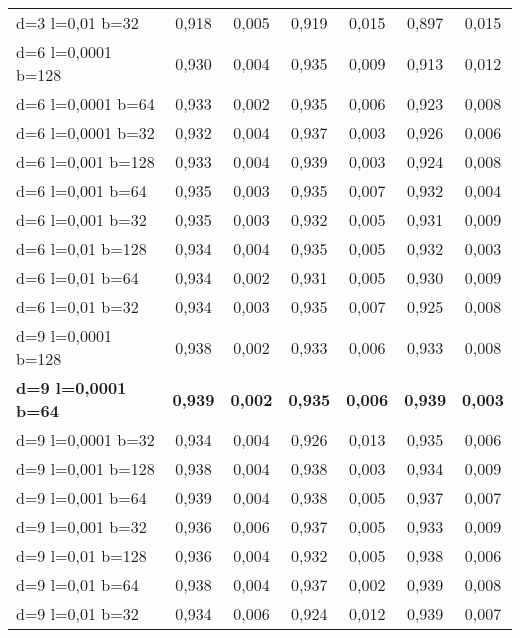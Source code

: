 \begin{table}[h!]
\begin{tabular}{lcccccc}
d=3 l=0,01 b=32  & 0,918  & 0,005  & 0,919  & 0,015 & 0,897 & 0,015 \\
d=6 l=0,0001 b=128  & 0,930  & 0,004  & 0,935  & 0,009 & 0,913 & 0,012 \\
d=6 l=0,0001 b=64  & 0,933  & 0,002  & 0,935  & 0,006 & 0,923 & 0,008 \\
d=6 l=0,0001 b=32  & 0,932  & 0,004  & 0,937  & 0,003 & 0,926 & 0,006 \\
d=6 l=0,001 b=128  & 0,933  & 0,004  & 0,939  & 0,003 & 0,924 & 0,008 \\
d=6 l=0,001 b=64  & 0,935  & 0,003  & 0,935  & 0,007 & 0,932 & 0,004 \\
d=6 l=0,001 b=32  & 0,935  & 0,003  & 0,932  & 0,005 & 0,931 & 0,009 \\
d=6 l=0,01 b=128  & 0,934  & 0,004  & 0,935  & 0,005 & 0,932 & 0,003 \\
d=6 l=0,01 b=64  & 0,934  & 0,002  & 0,931  & 0,005 & 0,930 & 0,009 \\
d=6 l=0,01 b=32  & 0,934  & 0,003  & 0,935  & 0,007 & 0,925 & 0,008 \\
d=9 l=0,0001 b=128  & 0,938  & 0,002  & 0,933  & 0,006 & 0,933 & 0,008 \\
\textbf{d=9 l=0,0001 b=64}  & \textbf{0,939}  & \textbf{0,002}  & \textbf{0,935}  & \textbf{0,006} & \textbf{0,939} & \textbf{0,003}  \\
d=9 l=0,0001 b=32  & 0,934  & 0,004  & 0,926  & 0,013 & 0,935 & 0,006 \\
d=9 l=0,001 b=128  & 0,938  & 0,004  & 0,938  & 0,003 & 0,934 & 0,009 \\
d=9 l=0,001 b=64  & 0,939  & 0,004  & 0,938 & 0,005 & 0,937 & 0,007 \\
d=9 l=0,001 b=32  & 0,936  & 0,006  & 0,937  & 0,005 & 0,933 & 0,009 \\
d=9 l=0,01 b=128  & 0,936  & 0,004  & 0,932  & 0,005 & 0,938 & 0,006 \\
d=9 l=0,01 b=64  & 0,938  & 0,004  & 0,937  & 0,002 & 0,939 & 0,008 \\
d=9 l=0,01 b=32  & 0,934  & 0,006  & 0,924  & 0,012 & 0,939 & 0,007 \\

\bottomrule
\end{tabular}
\end{table}